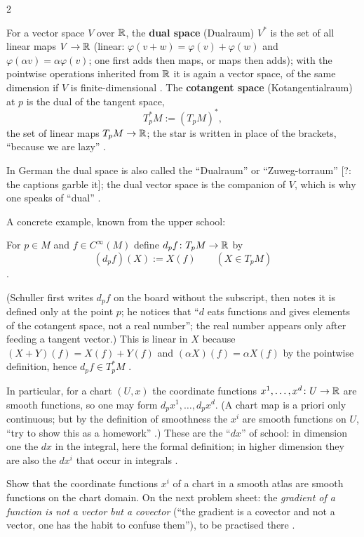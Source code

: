 \begin{paracol}{2}
\begin{definition}\label{def:ts-dual}
For a vector space $V$ over $\mathbb{R}$, the \textbf{dual space} (Dualraum) $V^*$ is the set of all linear maps $V\to\mathbb{R}$
(linear: $\varphi(v+w)=\varphi(v)+\varphi(w)$ and $\varphi(\alpha v)=\alpha\varphi(v)$; one first adds then maps, or maps then adds);
with the pointwise operations inherited from $\mathbb{R}$ it is again a vector space, of the same dimension if $V$ is
finite-dimensional .
The \textbf{cotangent space} (Kotangentialraum) at $p$ is the dual of the tangent space,
\[
  T_p^*M:=(T_pM)^*,
\]
the set of linear maps $T_pM\to\mathbb{R}$; the star is written in place of the brackets, ``because we are lazy''
.
\end{definition}
\begin{coursenote}
In German the dual space is also called the ``Dualraum'' or ``Zuweg-torraum'' [?: the captions garble it]; the dual vector
space is the companion of $V$, which is why one speaks of ``dual'' .
\end{coursenote}
A concrete example, known from the upper school:

\begin{definition}\label{def:ts-differential}
For $p\in M$ and $f\in C^\infty(M)$ define $d_pf\colon T_pM\to\mathbb{R}$ by
\[
  (d_pf)(X):=X(f)\qquad(X\in T_pM)
\]
.
\end{definition}
(Schuller first writes $d_pf$ on the board without the subscript, then notes it is defined only at the point $p$; he notices
that ``$d$ eats functions and gives elements of the cotangent space, not a real number''; the real number appears only
after feeding a tangent vector.) This is linear in $X$ because $(X+Y)(f)=X(f)+Y(f)$ and $(\alpha X)(f)=\alpha X(f)$ by the
pointwise definition, hence $d_pf\in T_p^*M$ .

In particular, for a chart $(U,x)$ the coordinate functions $x^1,\dots,x^d\colon U\to\mathbb{R}$ are smooth functions, so one may form
$d_px^1,\dots,d_px^d$. (A chart map is a priori only continuous; but by the definition of smoothness the $x^i$ are smooth
functions on $U$, ``try to show this as a homework'' .) These are the ``$dx$'' of
school: in dimension one the $dx$ in the integral, here the formal definition; in higher dimension they are also the $dx^i$
that occur in integrals .
\begin{exercise}\label{ex:ts-grad}
Show that the coordinate functions $x^i$ of a chart in a smooth atlas are smooth functions on the chart domain. On the
next problem sheet: the \emph{gradient of a function is not a vector but a covector} (``the gradient is a covector and not
a vector, one has the habit to confuse them''), to be practised there .
\end{exercise}


\end{paracol}
